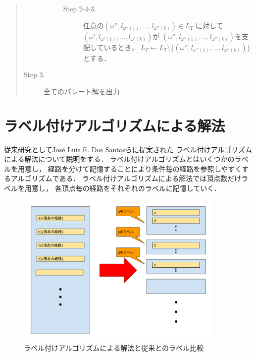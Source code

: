 \documentclass[12pt]{optlab-bachelor}
\begin{document}
\begin{quote}
\begin{description}
\begin{description}
\begin{description}
\begin{itemize}
        \end{itemize}
        \item[Step 2-4-3.] 任意の$(\omega'',l_{\omega''(1)},\ldots,l_{\omega''(k)})\in L_T$
        に対して$(\omega',l_{\omega'(1)},\ldots,l_{\omega'(k)})$が
        $(\omega'',l_{\omega''(1)},\ldots,l_{\omega''(k)})$を支配しているとき，
        $L_T \leftarrow L_T \setminus \{(\omega'',l_{\omega''(1)},\ldots,l_{\omega''(k)})\}$とする．
      \end{description}
    \end{description}
    \item[Step 3.] 全てのパレート解を出力
  \end{description}
\end{quote}

%

\section{ラベル付けアルゴリズムによる解法}
従来研究としてJosé Luis E. Dos Santosら\cite{Santos}に提案された
ラベル付けアルゴリズムによる解法について説明をする．
ラベル付けアルゴリズムとはいくつかのラベルを用意し，
経路を分けて記憶することにより条件毎の経路を参照しやすくするアルゴリズムである．
ラベル付けアルゴリズムによる解法では頂点数だけラベルを用意し，
各頂点毎の経路をそれぞれのラベルに記憶していく．

\begin{figure}[htbp]
  \centering
  \caption{ラベル付けアルゴリズムによる解法と従来とのラベル比較}
  \includegraphics[width=10.0cm]{fig/fig2.pdf}
\end{figure}
\end{document}
